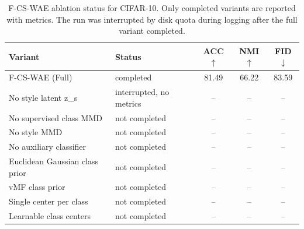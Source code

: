 \begin{table}[t]
\centering
\caption{F-CS-WAE ablation status for CIFAR-10. Only completed variants are reported with metrics. The run was interrupted by disk quota during logging after the full variant completed.}
\label{tab:f-cs-wae-ablation-status}
\begin{tabular}{llccc}
\toprule
Variant & Status & ACC$\uparrow$ & NMI$\uparrow$ & FID$\downarrow$ \\
\midrule
F-CS-WAE (Full) & completed & 81.49 & 66.22 & 83.59 \\
No style latent z_s & interrupted, no metrics & -- & -- & -- \\
No supervised class MMD & not completed & -- & -- & -- \\
No style MMD & not completed & -- & -- & -- \\
No auxiliary classifier & not completed & -- & -- & -- \\
Euclidean Gaussian class prior & not completed & -- & -- & -- \\
vMF class prior & not completed & -- & -- & -- \\
Single center per class & not completed & -- & -- & -- \\
Learnable class centers & not completed & -- & -- & -- \\
\bottomrule
\end{tabular}
\end{table}